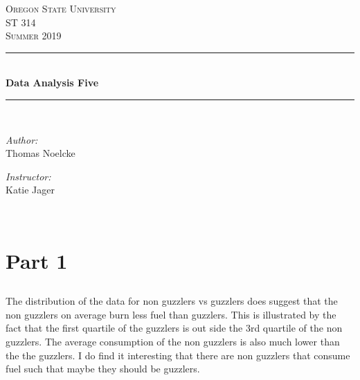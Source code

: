 \documentclass[letterpaper, onecolumn,10pt]{IEEEtran}
\begin{document}
    \begin{titlepage}
    \newcommand{\HRule}{\rule{\linewidth}{0.5mm}}
    \center
    \textsc{\Large Oregon State University}\\[1.5cm]
    \textsc{\Large ST 314}\\[0.5cm]
    \textsc{\Large Summer 2019}\\[0.5cm]
    \HRule \\[0.4cm]
    { \huge \bfseries Data Analysis Five}\\[0.4cm] %
    \HRule \\[1.5cm]
    \begin{minipage}{0.4\textwidth}
        \begin{flushleft} \large
        \emph{Author:}\\
        Thomas Noelcke
        \end{flushleft}
    \end{minipage}
    \begin{minipage}{0.4\textwidth}
        \begin{flushright} \large
        \emph{Instructor:} \\
        Katie Jager\\
        \end{flushright}
    \end{minipage}\\[2cm]
		\end{titlepage}
        
        \section{Part 1}
            \subsection{}
            
            \subsection{}
            The distribution of the data for non guzzlers vs guzzlers does suggest that the non guzzlers on average burn less fuel than guzzlers. This is illustrated by the fact that the first quartile of the guzzlers is out side the 3rd quartile of the non guzzlers. The average consumption of the non guzzlers is also much lower than the the guzzlers. I do find it interesting that there are non guzzlers that consume fuel such that maybe they should be guzzlers.\\
            
\end{document}
